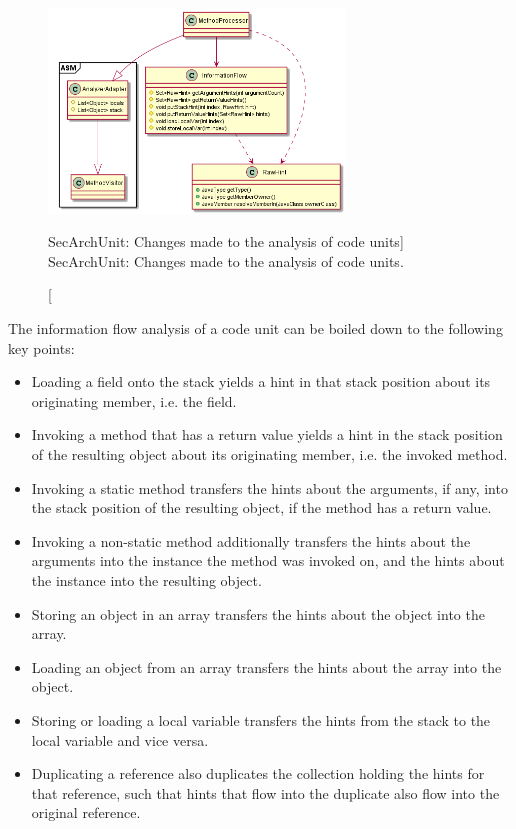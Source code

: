 \begin{figure}[H]
    \centering
    \includegraphics[width=0.7\textwidth]{figure/extension/MethodProcessor2.png}
    \caption
        [SecArchUnit: Changes made to the analysis of code units]
        {SecArchUnit: Changes made to the analysis of code units.}
    \label{fig:method_processor_2}
\end{figure}

The information flow analysis of a code unit can be boiled down to the following key points:

\begin{itemize}
    \item Loading a field onto the stack yields a hint in that stack position about its originating member, i.e. the field.
    \item Invoking a method that has a return value yields a hint in the stack position of the resulting object about its originating member, i.e. the invoked method.
    \item Invoking a static method transfers the hints about the arguments, if any, into the stack position of the resulting object, if the method has a return value.
    \item Invoking a non-static method additionally transfers the hints about the arguments into the instance the method was invoked on, and the hints about the instance into the resulting object.
    \item Storing an object in an array transfers the hints about the object into the array.
    \item Loading an object from an array transfers the hints about the array into the object.
    \item Storing or loading a local variable transfers the hints from the stack to the local variable and vice versa.
    \item Duplicating a reference also duplicates the collection holding the hints for that reference, such that hints that flow into the duplicate also flow into the original reference.
\end{itemize}

